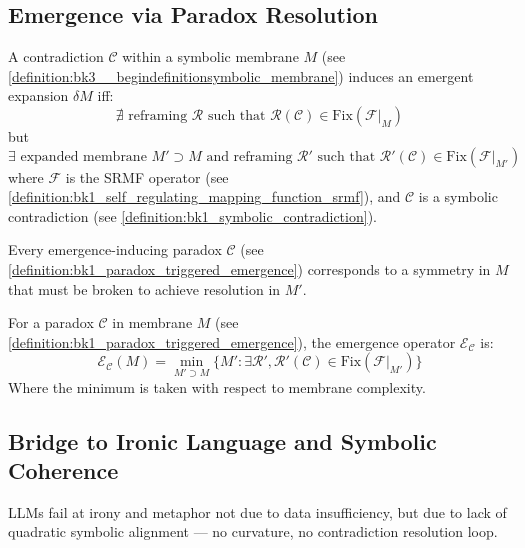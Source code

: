 \subsection{Emergence via Paradox Resolution}
\label{subsec:bk1_emergence_via_paradox_resolution}

\begin{definition}
\label{definition:bk1_paradox_triggered_emergence}
A contradiction $\mathcal{C}$ within a symbolic membrane $M$ (see \ref{definition:bk3__begindefinitionsymbolic_membrane}) induces an emergent expansion $\delta M$ iff:
\[
\nexists \text{ reframing } \mathcal{R} \text{ such that } \mathcal{R}(\mathcal{C}) \in \text{Fix}(\mathcal{F}|_M)
\]
but
\[
\exists \text{ expanded membrane } M' \supset M \text{ and reframing } \mathcal{R}' \text{ such that } \mathcal{R}'(\mathcal{C}) \in \text{Fix}(\mathcal{F}|_{M'})
\]
where $\mathcal{F}$ is the SRMF operator (see \ref{definition:bk1_self_regulating_mapping_function_srmf}), and $\mathcal{C}$ is a symbolic contradiction (see \ref{definition:bk1_symbolic_contradiction}).
\end{definition}

\begin{lemma}
\label{lemma:bk1_paradoxical_symmetry_breaking}
Every emergence-inducing paradox $\mathcal{C}$ (see \ref{definition:bk1_paradox_triggered_emergence}) corresponds to a symmetry in $M$ that must be broken to achieve resolution in $M'$.
\end{lemma}

\begin{definition}
\label{definition:bk1_emergence_operator}
For a paradox $\mathcal{C}$ in membrane $M$ (see \ref{definition:bk1_paradox_triggered_emergence}), the emergence operator $\mathcal{E}_{\mathcal{C}}$ is:
\[
\mathcal{E}_{\mathcal{C}}(M) = \min_{M' \supset M} \{M' : \exists \mathcal{R}', \mathcal{R}'(\mathcal{C}) \in \text{Fix}(\mathcal{F}|_{M'})\}
\]
Where the minimum is taken with respect to membrane complexity.
\end{definition}

\subsection{Bridge to Ironic Language and Symbolic Coherence}
\label{subsec:bk1_bridge_to_ironic_language_and_symbolic_coherence}

\begin{conjecture}
LLMs fail at irony and metaphor not due to data insufficiency, but due to lack of quadratic symbolic alignment — no curvature, no contradiction resolution loop.
\end{conjecture}

